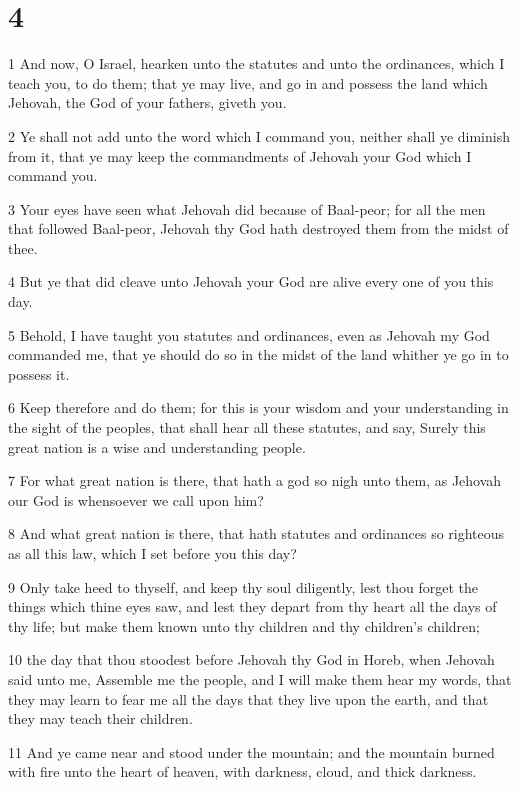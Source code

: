 \chapter{4}

\par 1 And now, O Israel, hearken unto the statutes and unto the ordinances, which I teach you, to do them; that ye may live, and go in and possess the land which Jehovah, the God of your fathers, giveth you.
\par 2 Ye shall not add unto the word which I command you, neither shall ye diminish from it, that ye may keep the commandments of Jehovah your God which I command you.
\par 3 Your eyes have seen what Jehovah did because of Baal-peor; for all the men that followed Baal-peor, Jehovah thy God hath destroyed them from the midst of thee.
\par 4 But ye that did cleave unto Jehovah your God are alive every one of you this day.
\par 5 Behold, I have taught you statutes and ordinances, even as Jehovah my God commanded me, that ye should do so in the midst of the land whither ye go in to possess it.
\par 6 Keep therefore and do them; for this is your wisdom and your understanding in the sight of the peoples, that shall hear all these statutes, and say, Surely this great nation is a wise and understanding people.
\par 7 For what great nation is there, that hath a god so nigh unto them, as Jehovah our God is whensoever we call upon him?
\par 8 And what great nation is there, that hath statutes and ordinances so righteous as all this law, which I set before you this day?
\par 9 Only take heed to thyself, and keep thy soul diligently, lest thou forget the things which thine eyes saw, and lest they depart from thy heart all the days of thy life; but make them known unto thy children and thy children's children;
\par 10 the day that thou stoodest before Jehovah thy God in Horeb, when Jehovah said unto me, Assemble me the people, and I will make them hear my words, that they may learn to fear me all the days that they live upon the earth, and that they may teach their children.
\par 11 And ye came near and stood under the mountain; and the mountain burned with fire unto the heart of heaven, with darkness, cloud, and thick darkness.
